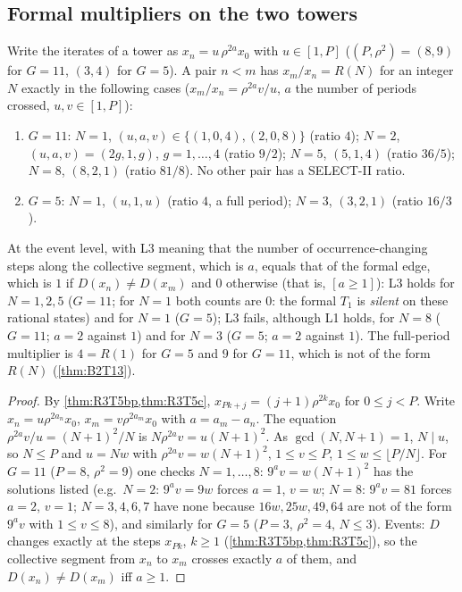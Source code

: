 \subsection{Formal multipliers on the two towers}
\begin{theorem}\label{thm:R3T7}
Write the iterates of a tower as $x_n=u\,\rho^{2a}x_0$ with $u\in[1,P]$ ($(P,\rho^2)=(8,9)$ for $G=11$, $(3,4)$ for $G=5$). A pair $n<m$ has $x_m/x_n=R(N)$ for an integer $N$ exactly in the following cases ($x_m/x_n=\rho^{2a}v/u$, $a$ the number of periods crossed, $u,v\in[1,P]$):
\begin{enumerate}[label=(\alph*),itemsep=1pt]
\item $G=11$: $N=1$, $(u,a,v)\in\{(1,0,4),(2,0,8)\}$ (ratio $4$); $N=2$, $(u,a,v)=(2g,1,g)$, $g=1,\dots,4$ (ratio $9/2$); $N=5$, $(5,1,4)$ (ratio $36/5$); $N=8$, $(8,2,1)$ (ratio $81/8$). No other pair has a SELECT-II ratio.
\item $G=5$: $N=1$, $(u,1,u)$ (ratio $4$, a full period); $N=3$, $(3,2,1)$ (ratio $16/3$).
\end{enumerate}
At the event level, with L3 meaning that the number of occurrence-changing steps along the collective segment, which is $a$, equals that of the formal edge, which is $1$ if $D(x_n)\ne D(x_m)$ and $0$ otherwise (that is, $[a\ge1]$): L3 holds for $N=1,2,5$ ($G=11$; for $N=1$ both counts are $0$: the formal $T_1$ is \emph{silent} on these rational states) and for $N=1$ ($G=5$); L3 fails, although L1 holds, for $N=8$ ($G=11$; $a=2$ against $1$) and for $N=3$ ($G=5$; $a=2$ against $1$). The full-period multiplier is $4=R(1)$ for $G=5$ and $9$ for $G=11$, which is not of the form $R(N)$ (\cref{thm:B2T13}).
\end{theorem}
\begin{proof}
By \cref{thm:R3T5bp,thm:R3T5c}, $x_{Pk+j}=(j+1)\rho^{2k}x_0$ for $0\le j<P$. Write $x_n=u\rho^{2a_n}x_0$, $x_m=v\rho^{2a_m}x_0$ with $a=a_m-a_n$. The equation $\rho^{2a}v/u=(N+1)^2/N$ is $N\rho^{2a}v=u(N+1)^2$. As $\gcd(N,N+1)=1$, $N\mid u$, so $N\le P$ and $u=Nw$ with $\rho^{2a}v=w(N+1)^2$, $1\le v\le P$, $1\le w\le\lfloor P/N\rfloor$. For $G=11$ ($P=8$, $\rho^2=9$) one checks $N=1,\dots,8$: $9^av=w(N+1)^2$ has the solutions listed (e.g.\ $N=2$: $9^av=9w$ forces $a=1$, $v=w$; $N=8$: $9^av=81$ forces $a=2$, $v=1$; $N=3,4,6,7$ have none because $16w,25w,49,64$ are not of the form $9^av$ with $1\le v\le8$), and similarly for $G=5$ ($P=3$, $\rho^2=4$, $N\le3$). Events: $D$ changes exactly at the steps $x_{Pk}$, $k\ge1$ (\cref{thm:R3T5bp,thm:R3T5c}), so the collective segment from $x_n$ to $x_m$ crosses exactly $a$ of them, and $D(x_n)\ne D(x_m)$ iff $a\ge1$. \qedhere
\end{proof}
